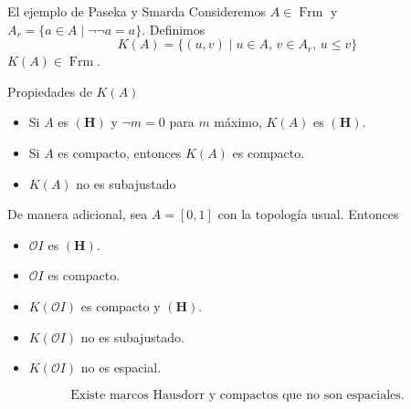 \documentclass[compress,12pt]{beamer}
\DeclareMathOperator{\Frm}{Frm}
\begin{document}
\begin{frame}{El ejemplo de Paseka y Smarda}
Consideremos $A\in\Frm$ y $A_r=\{a\in A\mid \neg\neg a=a\}$. Definimos
\[
K(A)=\{(u,v)\mid u\in A,\, v\in A_r,\, u\leq v\}
\]
$K(A)\in \Frm$.
\begin{block}{Propiedades de $K(A)$}
\begin{itemize}
	\item Si $A$ es $\mathbf{(H)}$ y $\neg m=0$ para $m$ máximo, $K(A)$ es $\mathbf{(H)}$.
	\item Si $A$ es compacto, entonces $K(A)$ es compacto.
	\item $K(A)$ no es subajustado
\end{itemize}
\end{block}
\end{frame}

\begin{frame}
De manera adicional, sea $A=[0,1]$ con la topología usual. Entonces
\begin{itemize}
\item $\mathcal{O}I$ es $\mathbf{(H)}$.
\item $\mathcal{O}I$ es compacto.
\item $K(\mathcal{O}I)$ es compacto y $\mathbf{(H)}$.
\item $K(\mathcal{O}I)$ no es subajustado.
\item $K(\mathcal{O}I)$ no es espacial.
\end{itemize}

\[
\mbox{Existe marcos Hausdorr y compactos que no son espaciales}.
\]
\end{frame}

\End
\end{document}
